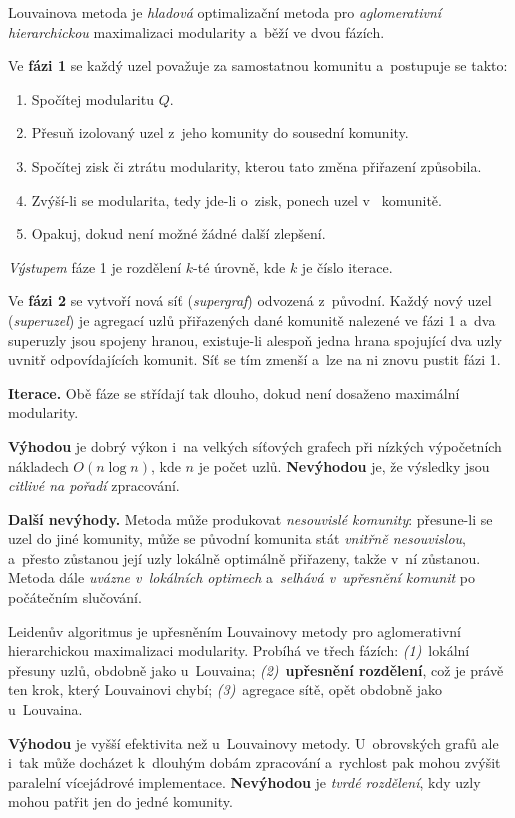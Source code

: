 \documentclass[11pt,a4paper]{article}
\theoremstyle{definition}
\begin{document}
\begin{defbox}
Louvainova metoda je \emph{hladová} optimalizační metoda pro \emph{aglomerativní hierarchickou}
maximalizaci modularity a~běží ve dvou fázích.

Ve \textbf{fázi 1} se každý uzel považuje za samostatnou komunitu a~postupuje se takto:
\begin{enumerate}
\item Spočítej modularitu $Q$.
\item Přesuň izolovaný uzel z~jeho komunity do sousední komunity.
\item Spočítej zisk či ztrátu modularity, kterou tato změna přiřazení způsobila.
\item Zvýší-li se modularita, tedy jde-li o~zisk, ponech uzel v~ komunitě.
\item Opakuj, dokud není možné žádné další zlepšení.
\end{enumerate}
\emph{Výstupem} fáze 1 je rozdělení $k$-té úrovně, kde $k$ je číslo iterace.

Ve \textbf{fázi 2} se vytvoří nová síť (\emph{supergraf}) odvozená z~původní. Každý nový uzel
(\emph{superuzel}) je agregací uzlů přiřazených dané komunitě nalezené ve fázi 1 a~dva
superuzly jsou spojeny hranou, existuje-li alespoň jedna hrana spojující dva uzly uvnitř
odpovídajících komunit. Síť se tím zmenší a~lze na ni znovu pustit fázi 1.

\textbf{Iterace.} Obě fáze se střídají tak dlouho, dokud není dosaženo maximální modularity.

\textbf{Výhodou} je dobrý výkon i~na velkých síťových grafech při nízkých výpočetních nákladech
$O(n\log n)$, kde $n$ je počet uzlů. \textbf{Nevýhodou} je, že výsledky jsou \emph{citlivé
na pořadí} zpracování.

\textbf{Další nevýhody.} Metoda může produkovat \emph{nesouvislé komunity}: přesune-li se uzel
do jiné komunity, může se původní komunita stát \emph{vnitřně nesouvislou}, a~přesto zůstanou
její uzly lokálně optimálně přiřazeny, takže v~ní zůstanou. Metoda dále \emph{uvázne v~lokálních
optimech} a~\emph{selhává v~upřesnění komunit} po počátečním slučování.
\end{defbox}

\begin{defbox}
Leidenův algoritmus je upřesněním Louvainovy metody pro aglomerativní hierarchickou maximalizaci
modularity. Probíhá ve třech fázích: \emph{(1)}~lokální přesuny uzlů, obdobně jako u~Louvaina;
\emph{(2)}~\textbf{upřesnění rozdělení}, což je právě ten krok, který Louvainovi chybí;
\emph{(3)}~agregace sítě, opět obdobně jako u~Louvaina.

\textbf{Výhodou} je vyšší efektivita než u~Louvainovy metody. U~obrovských grafů ale i~tak může
docházet k~dlouhým dobám zpracování a~rychlost pak mohou zvýšit paralelní vícejádrové
implementace. \textbf{Nevýhodou} je \emph{tvrdé rozdělení}, kdy uzly mohou patřit jen do jedné
komunity.
\end{defbox}
\end{document}
